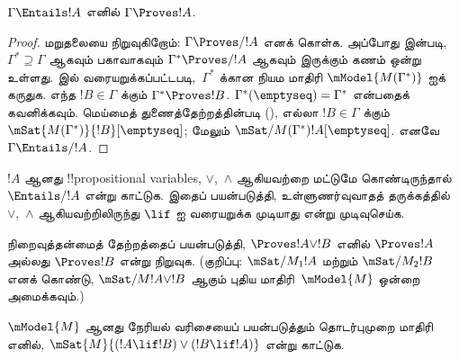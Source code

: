 \documentclass[../../../include/open-logic-section]{subfiles}
\begin{document}


\begin{thm}
  $\Gamma \Entails !A$ எனில் $\Gamma \Proves !A$.
\end{thm}

\begin{proof}
  மறுதலையை நிறுவுகிறோம்: $\Gamma \Proves/ !A$ எனக் கொள்க. அப்போது
   இன்படி, $\Gamma^* \supseteq \Gamma$ ஆகவும்
  பகாவாகவும் $\Gamma^* \Proves/ !A$ ஆகவும் இருக்கும் கணம் ஒன்று உள்ளது.
   இல்
  வரையறுக்கப்பட்டபடி,~$\Gamma^*$ க்கான நியம மாதிரி
  $\mModel{M(\Gamma^*)}$ ஐக் கருதுக. எந்த $!B \in \Gamma$ க்கும்
  $\Gamma^* \Proves !B$. $\Gamma^*(\emptyseq) = \Gamma^*$ என்பதைக்
  கவனிக்கவும். மெய்மைத் துணைத்தேற்றத்தின்படி
  (), எல்லா $!B \in \Gamma$ க்கும்
  $\mSat{M(\Gamma^*)}{!B}[\emptyseq]$; மேலும்
  $\mSat/{M(\Gamma^*)}{!A}[\emptyseq]$. எனவே
  $\Gamma \Entails/ !A$.
\end{proof}

\begin{prob}
  $!A$ ஆனது !!{propositional variable}s, $\lor$,~$\land$ ஆகியவற்றை
  மட்டுமே கொண்டிருந்தால் $\Entails/ !A$ என்று காட்டுக. இதைப் பயன்படுத்தி,
  உள்ளுணர்வுவாதத் தருக்கத்தில் $\lor$,~$\land$ ஆகியவற்றிலிருந்து $\lif$ ஐ
  வரையறுக்க முடியாது என்று முடிவுசெய்க.
\end{prob}

\begin{prob}
  நிறைவுத்தன்மைத் தேற்றத்தைப் பயன்படுத்தி, $\Proves !A \lor !B$ எனில்
  $\Proves !A$ அல்லது $\Proves !B$ என்று நிறுவுக. (குறிப்பு:
  $\mSat/{M_1}{!A}$ மற்றும் $\mSat/{M_2}{!B}$ எனக் கொண்டு,
  $\mSat/{M}{!A \lor !B}$ ஆகும் புதிய மாதிரி~$\mModel{M}$ ஒன்றை அமைக்கவும்.)
\end{prob}

\begin{prob}
  $\mModel{M}$ ஆனது நேரியல் வரிசையைப் பயன்படுத்தும் தொடர்புமுறை மாதிரி எனில்,
  $\mSat{M}{(!A \lif !B)\lor(!B \lif !A)}$ என்று காட்டுக.
\end{prob}
\end{document}
